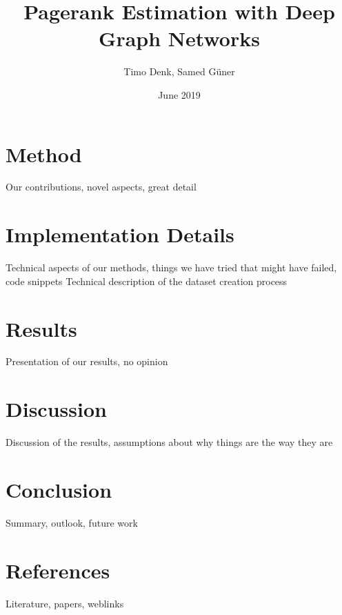 \documentclass{article}
\title{Pagerank Estimation with Deep Graph Networks}
\author{Timo Denk, Samed Güner}
\date{June 2019}
\begin{document}
\maketitle





\section{Method}
Our contributions, novel aspects, great detail



\section{Implementation Details}
Technical aspects of our methods, things we have tried that might have failed, code snippets
Technical description of the dataset creation process

\section{Results}
Presentation of our results, no opinion

\section{Discussion}
Discussion of the results, assumptions about why things are the way they are

\section{Conclusion}
Summary, outlook, future work

\section{References}
Literature, papers, weblinks
\printbibliography
\end{document}
